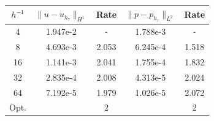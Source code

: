 \\
\\
\begin{center} 
\centering
\begin{tabular}{c|c|c|c|c}
$h^{-1}$ & $\|u - u_{h_{\tau}}\|_{H^1}$ & Rate & $\|p - p_{h_{\tau}}\|_{L^2}$ & Rate\\\hline
4  & 1.947e-2 & -     & 1.788e-3 & - \\
8  & 4.693e-3 & 2.053 & 6.245e-4 & 1.518 \\
16 & 1.141e-3 & 2.041 & 1.755e-4 & 1.832 \\
32 & 2.835e-4 & 2.008 & 4.313e-5 & 2.024 \\
64 & 7.192e-5 & 1.979 & 1.026e-5 & 2.072 \\\hline
Opt. & & 2 & & 2 
\end{tabular}
 \label{tab:biot_default_space_error}
\end{center}
\mbox{}\\ \\
